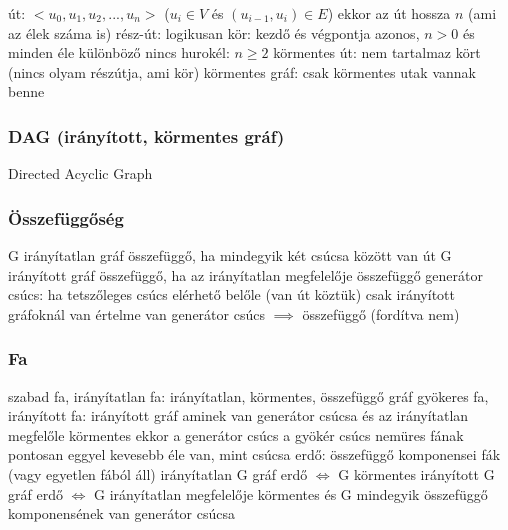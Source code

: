 \documentclass[12pt,a4paper]{article}
\begin{document}
\begin{outline}
	\1 út: $<u_0, u_1, u_2, ...,u_n>$ ($u_i \in V$ és $(u_{i-1},u_i) \in E$)
		\2 ekkor az út hossza $n$ (ami az élek száma is)
	\1 rész-út: logikusan
	\1 kör: kezdő és végpontja azonos, $n>0$ és minden éle különböző
		\2 nincs hurokél: $n \ge 2$
	\1 körmentes út: nem tartalmaz kört (nincs olyam részútja, ami kör)
	\1 körmentes gráf: csak körmentes utak vannak benne
\end{outline}

\pagebreak

\subsubsection{DAG (irányított, körmentes gráf)}

\begin{outline}
	\1 Directed Acyclic Graph
\end{outline}

\subsubsection{Összefüggőség}

\begin{outline}
	\1 G irányítatlan gráf összefüggő, ha mindegyik két csúcsa között van út
	\1 G irányított gráf összefüggő, ha az irányítatlan megfelelője összefüggő
	\1 generátor csúcs: ha tetszőleges csúcs elérhető belőle (van út köztük)
		\2 csak irányított gráfoknál van értelme
		\2 van generátor csúcs $\implies$ összefüggő (fordítva nem)
\end{outline}

\subsubsection{Fa}

\begin{outline}
	\1 szabad fa, irányítatlan fa: irányítatlan, körmentes, összefüggő gráf
	\1 gyökeres fa, irányított fa: irányított gráf aminek van generátor csúcsa
	és az irányítatlan megfelőle körmentes
		\2 ekkor a generátor csúcs a gyökér csúcs
	\1 nemüres fának pontosan eggyel kevesebb éle van, mint csúcsa
	\1 erdő: összefüggő komponensei fák (vagy egyetlen fából áll)
		\2 irányítatlan G gráf erdő $\Leftrightarrow$ G körmentes
		\2 irányított G gráf erdő $\Leftrightarrow$ G irányítatlan megfelelője körmentes
		és G mindegyik összefüggő komponensének van generátor csúcsa
\end{outline}
\end{document}
